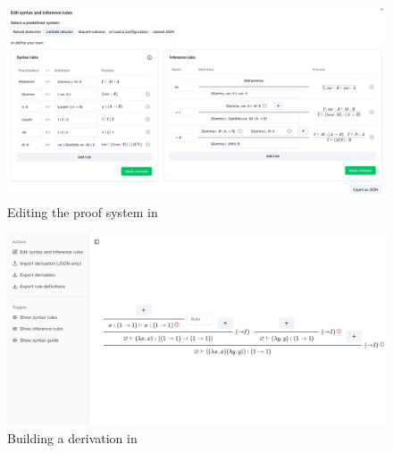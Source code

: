 \begin{figure}[!htbp]
    \centering
    \includegraphics[width=\textwidth]{introduction/editor.png}
    \caption{Editing the proof system in \projectname{}}
    \label{fig:introduction:editor}
\end{figure}

\begin{figure}[!htbp]
    \centering
    \includegraphics[width=\textwidth]{introduction/builder.png}
    \caption{Building a derivation in \projectname{}}
    \label{fig:introduction:builder}
\end{figure}